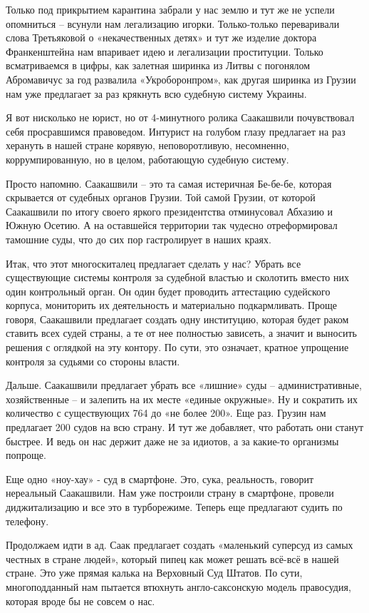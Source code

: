 Только под прикрытием карантина забрали у нас землю и тут же не успели
опомниться – всунули нам легализацию игорки. Только-только переваривали слова
Третьяковой о «некачественных детях» и тут же изделие доктора Франкенштейна нам
впаривает идею и легализации проституции. Только всматриваемся в цифры, как
залетная ширинка из Литвы с погонялом Абромавичус за год развалила
«Укроборонпром», как другая ширинка из Грузии нам уже предлагает за раз
крякнуть всю судебную систему Украины.

Я вот нисколько не юрист, но от 4-минутного ролика Саакашвили почувствовал себя
просравшимся правоведом. Интурист на голубом глазу предлагает на раз херануть в
нашей стране корявую, неповоротливую, несомненно, коррумпированную, но в целом,
работающую судебную систему.

Просто напомню. Саакашвили – это та самая истеричная Бе-бе-бе, которая
скрывается от судебных органов Грузии. Той самой Грузии, от которой Саакашвили
по итогу своего яркого президентства отминусовал Абхазию и Южную Осетию. А на
оставшейся территории так чудесно отреформировал тамошние суды, что до сих пор
гастролирует в наших краях.

Итак, что этот многоскиталец предлагает сделать у нас? Убрать все существующие
системы контроля за судебной властью и сколотить вместо них один контрольный
орган. Он один будет проводить аттестацию судейского корпуса, мониторить их
деятельность и материально подкармливать. Проще говоря, Саакашвили предлагает
создать одну институцию, которая будет раком ставить всех судей страны, а те от
нее полностью зависеть, а значит и выносить решения с оглядкой на эту контору.
По сути, это означает, кратное упрощение контроля за судьями со стороны власти.

Дальше. Саакашвили предлагает убрать все «лишние» суды – административные,
хозяйственные – и залепить на их месте «единые окружные». Ну и сократить их
количество с существующих 764 до «не более 200». Еще раз. Грузин нам предлагает
200 судов на всю страну. И тут же добавляет, что работать они станут быстрее. И
ведь он нас держит даже не за идиотов, а за какие-то организмы попроще.

Еще одно «ноу-хау» - суд в смартфоне. Это, сука, реальность, говорит нереальный
Саакашвили. Нам уже построили страну в смартфоне, провели диджитализацию и все
это в турборежиме. Теперь еще предлагают судить по телефону.

Продолжаем идти в ад. Саак предлагает создать «маленький суперсуд из самых
честных в стране людей», который пипец как может решать всё-всё в нашей стране.
Это уже прямая калька на Верховный Суд Штатов. По сути, многоподданный нам
пытается втюхнуть англо-саксонскую модель правосудия, которая вроде бы не
совсем о нас.

